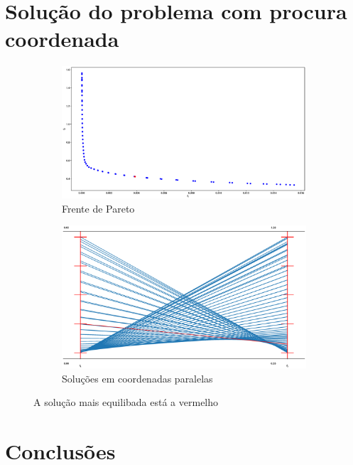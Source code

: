 \documentclass[a4paper,12pt]{article}
\begin{document}
\section{Solução do problema com procura coordenada}



\begin{figure}[!htbp]
\centering
\begin{subfigure}{.5\textwidth}
  \centering
  \includegraphics[width=.99\linewidth]{PS_objSpace.eps}
  \caption{Frente de Pareto}
  \label{fig:sub1}
\end{subfigure}%
\begin{subfigure}{.5\textwidth}
  \centering
  \includegraphics[width=.99\linewidth]{PS_parallel_coord.eps}
  \caption{Soluções em coordenadas paralelas}
  \label{fig:sub2}
\end{subfigure}
\caption{\label{fig:defIm2}A solução mais equilibada está a vermelho}
\end{figure}



\section{Conclusões}
\end{document}
